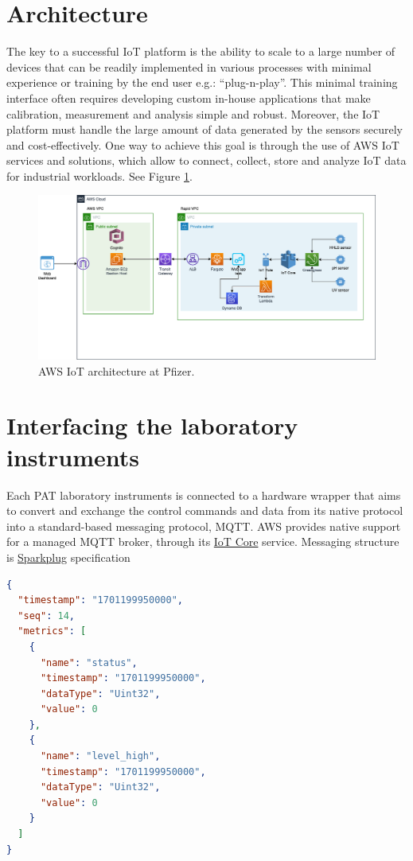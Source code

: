 \documentclass[10pt]{article}
\begin{document}
\section*{Architecture}
The key to a successful IoT platform is the ability to
scale to a large number of devices that can be readily implemented 
in various processes with minimal experience or training
by the end user e.g.: “plug-n-play”. 
This minimal training interface often requires developing custom
in-house applications that make calibration, measurement
and analysis simple and robust. Moreover, the IoT platform 
must handle the large amount of data generated by
the sensors securely and cost-effectively. One way to achieve this goal is through
the use of AWS IoT services and solutions, which allow to connect, collect, store and analyze
IoT data for industrial workloads. See Figure \ref{architecture}.

\begin{figure}[h]
\centering
\includegraphics[width=1\textwidth]{architecture}
\caption{AWS IoT architecture at Pfizer.}
\label{architecture}
\end{figure}


\section*{Interfacing the laboratory instruments}
Each PAT laboratory instruments is connected to a hardware wrapper 
that aims to convert and exchange the control commands and data from 
its native protocol into a standard-based messaging protocol, MQTT.
AWS provides native support for a managed MQTT broker, 
through its \href{https://aws.amazon.com/iot-core/?nc=sn&loc=0}{IoT Core} service.
Messaging structure is \href{https://sparkplug.eclipse.org/specification/version/2.2/documents/sparkplug-specification-2.2.pdf}{Sparkplug\texttrademark} specification

\begin{lstlisting}[language=json, caption={Example of MQTT payload following Sparkplug\texttrademark B.}, label={lst:spark}]
{
  "timestamp": "1701199950000",
  "seq": 14,
  "metrics": [
    {
      "name": "status",
      "timestamp": "1701199950000",
      "dataType": "Uint32",
      "value": 0
    },
    {
      "name": "level_high",
      "timestamp": "1701199950000",
      "dataType": "Uint32",
      "value": 0
    }
  ]
}

\end{lstlisting}
\end{document}
